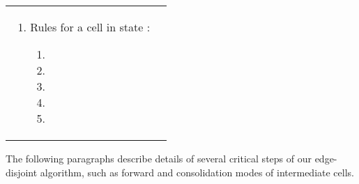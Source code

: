 \documentclass[preliminary,copyright,creativecommons]{eptcs}
\theoremstyle{remark}
\begin{document}
\begin{tabular}[t]{ll}
\begin{minipage}[t]{3.0in}
\begin{enumerate}
\begin{enumerate}[1]
    \item 
    \item 
    \item 
    \end{enumerate}

  \item Rules for a cell  in state :
    \begin{enumerate}[1]
    \item 

    \item 

    \item 
    \item 
    \item 

    \end{enumerate}

  \end{enumerate}
  \end{minipage}
\end{tabular}

The following paragraphs describe details of several critical steps of our edge-disjoint algorithm, such as forward and consolidation modes of intermediate cells.
\end{document}
